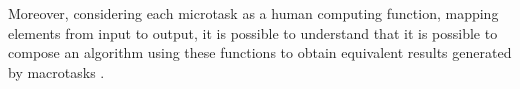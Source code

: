 Moreover, considering each microtask as a human computing function, mapping elements from input to output, it is possible to understand that it is possible to compose an algorithm using these functions to obtain equivalent results generated by macrotasks \cite{Chen:2017:RIM:3025453.3025969}.




